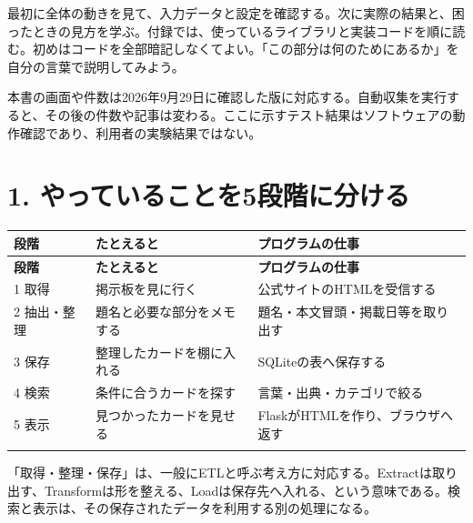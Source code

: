 \documentclass[a4paper,10pt]{ltjsarticle}
\begin{document}
最初に全体の動きを見て、入力データと設定を確認する。次に実際の結果と、困ったときの見方を学ぶ。付録では、使っているライブラリと実装コードを順に読む。初めはコードを全部暗記しなくてよい。「この部分は何のためにあるか」を自分の言葉で説明してみよう。


本書の画面や件数は2026年9月29日に確認した版に対応する。自動収集を実行すると、その後の件数や記事は変わる。ここに示すテスト結果はソフトウェアの動作確認であり、利用者の実験結果ではない。


\clearpage

\section*{1. やっていることを5段階に分ける}

{\small\begin{longtable}{@{}>{\raggedright\arraybackslash}p{}>{\raggedright\arraybackslash}p{}>{\raggedright\arraybackslash}p{}@{}}

\rowcolor{Pale}\textbf{段階} & \textbf{たとえると} & \textbf{プログラムの仕事} \\ \midrule

\endfirsthead

\rowcolor{Pale}\textbf{段階} & \textbf{たとえると} & \textbf{プログラムの仕事} \\ \midrule\endhead

1 取得 & 掲示板を見に行く & 公式サイトのHTMLを受信する \\ \addlinespace[3pt]

2 抽出・整理 & 題名と必要な部分をメモする & 題名・本文冒頭・掲載日等を取り出す \\ \addlinespace[3pt]

3 保存 & 整理したカードを棚に入れる & SQLiteの表へ保存する \\ \addlinespace[3pt]

4 検索 & 条件に合うカードを探す & 言葉・出典・カテゴリで絞る \\ \addlinespace[3pt]

5 表示 & 見つかったカードを見せる & FlaskがHTMLを作り、ブラウザへ返す \\ \addlinespace[3pt]

\bottomrule\end{longtable}}

「取得・整理・保存」は、一般にETLと呼ぶ考え方に対応する。Extractは取り出す、Transformは形を整える、Loadは保存先へ入れる、という意味である。検索と表示は、その保存されたデータを利用する別の処理になる。
\end{document}
